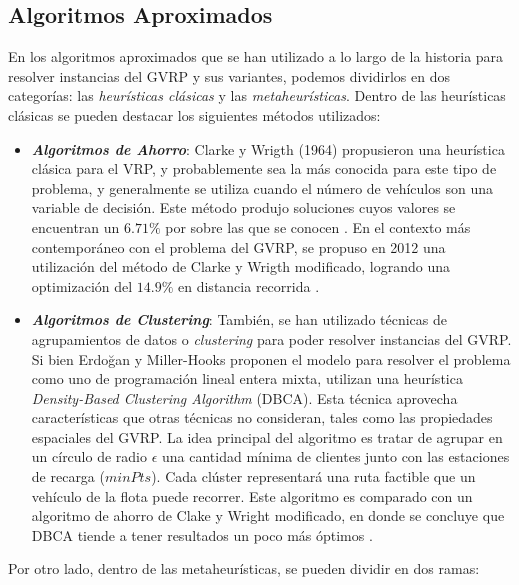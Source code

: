 \documentclass[letter, 10pt]{article}
\begin{document}
\subsection{Algoritmos Aproximados}
En los algoritmos aproximados que se han utilizado a lo largo de la historia para resolver instancias del GVRP y sus variantes, podemos dividirlos en dos categorías: las \emph{heurísticas clásicas} y las \emph{metaheurísticas}. Dentro de las heurísticas clásicas se pueden destacar los siguientes métodos utilizados:

\begin{itemize}
    \item \textbf{\emph{Algoritmos de Ahorro}}: Clarke y Wrigth (1964) propusieron una heurística clásica para el VRP, y probablemente sea la más conocida para este tipo de problema, y generalmente se utiliza cuando el número de vehículos son una variable de decisión. Este método produjo soluciones cuyos valores se encuentran un $6.71\%$ por sobre las que se conocen \cite{CLASSICHEURISTICS}. En el contexto más contemporáneo con el problema del GVRP, se propuso en 2012 una utilización del método de Clarke y Wrigth modificado, logrando una optimización del $14.9\%$ en distancia recorrida \cite{ARANDAUSON}.
    
    \item \textbf{\emph{Algoritmos de Clustering}}: También, se han utilizado técnicas de agrupamientos de datos o \emph{clustering} para poder resolver instancias del GVRP. Si bien Erdoğan y Miller-Hooks proponen el modelo para resolver el problema como uno de programación lineal entera mixta, utilizan una heurística \emph{Density-Based Clustering Algorithm} (DBCA). Esta técnica aprovecha características que otras técnicas no consideran, tales como las propiedades espaciales del GVRP. La idea principal del algoritmo es tratar de agrupar en un círculo de radio $\epsilon$ una cantidad mínima de clientes junto con las estaciones de recarga ($minPts$). Cada clúster representará una ruta factible que un vehículo de la flota puede recorrer. Este algoritmo es comparado con un algoritmo de ahorro de Clake y Wright modificado, en donde se concluye que DBCA tiende a tener resultados un poco más óptimos \cite{ERDOGANMILLERHOOKS}.
    

\end{itemize}
Por otro lado, dentro de las metaheurísticas, se pueden dividir en dos ramas:
\end{document}
